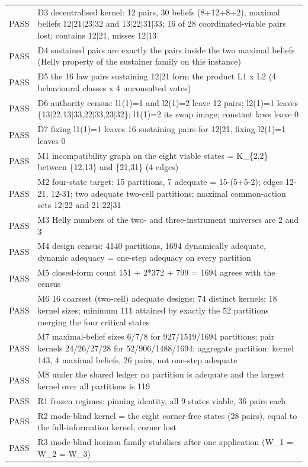 \begin{longtable}{lp{}}
PASS & D3 decentralised kernel: 12 pairs, 30 beliefs (8+12+8+2), maximal beliefs 12$|$21$|$23$|$32 and 13$|$22$|$31$|$33; 16 of 28 coordinated-viable pairs lost; contains 12$|$21, misses 12$|$13 \\
PASS & D4 sustained pairs are exactly the pairs inside the two maximal beliefs (Helly property of the sustainer family on this instance) \\
PASS & D5 the 16 law pairs sustaining 12$|$21 form the product L1 x L2 (4 behavioural classes x 4 unconsulted votes) \\
PASS & D6 authority census: l1(1)=1 and l2(1)=2 leave 12 pairs; l2(1)=1 leaves \{13$|$22,13$|$33,22$|$33,23$|$32\}; l1(1)=2 its swap image; constant laws leave 0 \\
PASS & D7 fixing l1(1)=1 leaves 16 sustaining pairs for 12$|$21, fixing l2(1)=1 leaves 0 \\
PASS & M1 incompatibility graph on the eight viable states = K\_\{2,2\} between \{12,13\} and \{21,31\} (4 edges) \\
PASS & M2 four-state target: 15 partitions, 7 adequate = 15-(5+5-2); edges 12-21, 12-31; two adequate two-cell partitions; maximal common-action sets 12$|$22 and 21$|$22$|$31 \\
PASS & M3 Helly numbers of the two- and three-instrument universes are 2 and 3 \\
PASS & M4 design census: 4140 partitions, 1694 dynamically adequate, dynamic adequacy = one-step adequacy on every partition \\
PASS & M5 closed-form count 151 + 2*372 + 799 = 1694 agrees with the census \\
PASS & M6 16 coarsest (two-cell) adequate designs; 74 distinct kernels; 18 kernel sizes; minimum 111 attained by exactly the 52 partitions merging the four critical states \\
PASS & M7 maximal-belief sizes 6/7/8 for 927/1519/1694 partitions; pair kernels 24/26/27/28 for 52/906/1488/1694; aggregate partition: kernel 143, 4 maximal beliefs, 26 pairs, not one-step adequate \\
PASS & M8 under the shared ledger no partition is adequate and the largest kernel over all partitions is 119 \\
PASS & R1 frozen regimes: pinning identity, all 9 states viable, 36 pairs each \\
PASS & R2 mode-blind kernel = the eight corner-free states (28 pairs), equal to the full-information kernel; corner lost \\
PASS & R3 mode-blind horizon family stabilises after one application (W\_1 = W\_2 = W\_3) \\

\end{longtable}
